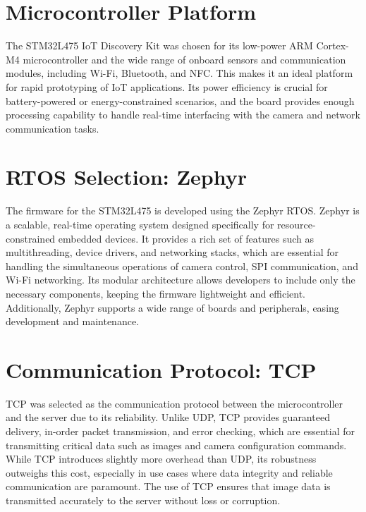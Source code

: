 \section{Microcontroller Platform}

The STM32L475 IoT Discovery Kit was chosen for its low-power ARM Cortex-M4 microcontroller and the wide range of onboard sensors and communication modules, including Wi-Fi, Bluetooth, and NFC. This makes it an ideal platform for rapid prototyping of IoT applications. Its power efficiency is crucial for battery-powered or energy-constrained scenarios, and the board provides enough processing capability to handle real-time interfacing with the camera and network communication tasks.

\section{RTOS Selection: Zephyr}

The firmware for the STM32L475 is developed using the Zephyr RTOS. Zephyr is a scalable, real-time operating system designed specifically for resource-constrained embedded devices. It provides a rich set of features such as multithreading, device drivers, and networking stacks, which are essential for handling the simultaneous operations of camera control, SPI communication, and Wi-Fi networking. Its modular architecture allows developers to include only the necessary components, keeping the firmware lightweight and efficient. Additionally, Zephyr supports a wide range of boards and peripherals, easing development and maintenance.

\section{Communication Protocol: TCP}

TCP was selected as the communication protocol between the microcontroller and the server due to its reliability. Unlike UDP, TCP provides guaranteed delivery, in-order packet transmission, and error checking, which are essential for transmitting critical data such as images and camera configuration commands. While TCP introduces slightly more overhead than UDP, its robustness outweighs this cost, especially in use cases where data integrity and reliable communication are paramount. The use of TCP ensures that image data is transmitted accurately to the server without loss or corruption.

